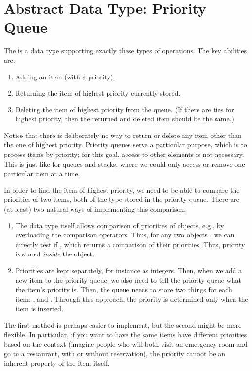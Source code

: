 \section{Abstract Data Type: Priority Queue}
The  is a data type supporting exactly these
types of operations. The key abilities are:
\begin{enumerate}
\item Adding an item (with a priority).
\item Returning the item of highest priority currently stored.
\item Deleting the item of highest priority from the queue.
(If there are ties for highest priority, then the returned and deleted
item should be the same.)
\end{enumerate}
Notice that there is deliberately no way to return or delete any item
other than the one of highest priority.
Priority queues serve a particular purpose, which is to process items
by priority; for this goal, access to other elements is not necessary.
This is just like for queues and stacks, where we could only access or
remove one particular item at a time.

In order to find the item of highest priority, we need to be able to
compare the priorities of two items, both of the type  stored
in the priority queue. 
There are (at least) two natural ways of implementing this comparison.

\begin{enumerate}
\item The data type  itself allows comparison of priorities of
  objects, e.g., by overloading the comparison operators. 
  Thus, for any two objects , we can directly test if
  , which returns a comparison of their priorities. 
  Thus, priority is stored \emph{inside} the object.
\item Priorities are kept separately, for instance as integers. 
  Then, when we add a new item to the priority queue, we also need to
  tell the priority queue what the item's priority is.
  Then, the queue needs to store two things for each item: 
  , and . 
  Through this approach, the priority is determined only when the item
  is inserted.
\end{enumerate}

The first method is perhaps easier to implement, but the second might be
more flexible. In particular, if you want to have the same items have
different priorities based on the context (imagine people who will
both visit an emergency room and go to a restaurant, with or without
reservation), the priority cannot be an inherent property of the item
itself.

